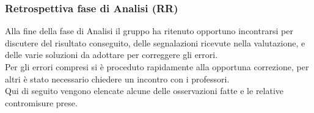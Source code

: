 \documentclass[../piano_di_qualifica.tex]{subfiles}
\begin{document}
\subsubsection{Retrospettiva fase di Analisi (RR)}
\label{par:retrospettiva-RR}
Alla fine della fase di Analisi il gruppo ha ritenuto opportuno incontrarsi per discutere del risultato conseguito, delle segnalazioni
ricevute nella valutazione, e delle varie soluzioni da adottare per correggere gli errori.\\
Per gli errori compresi si è proceduto rapidamente alla opportuna correzione, per altri è stato necessario chiedere un incontro
con i professori. \\
Qui di seguito vengono elencate alcune delle osservazioni fatte e le relative contromisure prese.\\
\end{document}
